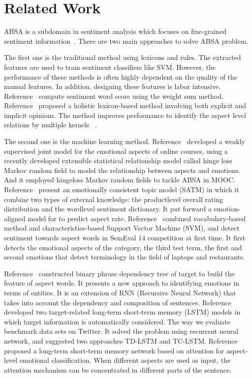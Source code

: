 \documentclass[runningheads, twocolumn]{llncs}
\begin{document}
\section{Related Work}
ABSA is a subdomain in sentiment analysis which focuses on fine-grained sentiment information~\cite{DBLP:series/synthesis/2012Liu}. There are two main approaches to solve ABSA problem.

The first one is the traditional method using lexicons and rules. The extracted features are used to train sentiment classifiers like SVM. However, the performance of these methods is often highly dependent on the quality of the manual features. In addition, designing these features is labor intensive. Reference~\cite{DBLP:conf/kdd/HuL04} compute sentiment word score using the weight sum method. Reference~\cite{DBLP:conf/wsdm/DingLY08} proposed a holistic lexicon-based method involving both explicit and implicit opinions. The method improves performance to identify the aspect level relations by multiple kernels ~\cite{DBLP:conf/cicling/NguyenS15}.

The second one is the machine learning method. Reference~\cite{DBLP:conf/acl/RameshKFG15} developed a weakly supervised joint model for the emotional aspects of online courses, using a recently developed extensible statistical relationship model called hinge loss Markov random field to model the relationship between aspects and emotions. And it employed hingeloss Markov random fields to tackle ABSA in MOOC. Reference~\cite{DBLP:conf/emnlp/WangE14} present an emotionally consistent topic model (SATM) in which it combine two types of external knowledge: the productlevel overall rating distribution and the wordlevel sentiment dictionary. It put forward a emotion-aligned model for to predict aspect rate. Reference~\cite{DBLP:conf/semeval/KiritchenkoZCM14} combined vocabulary-based method and characteristics-based Support Vector Machine (SVM), and  detect sentiment towards aspect words in SemEval 14 competition at first time. It first detects the emotional aspects of the category, the third test term, the first and second emotions that detect terminology in the field of laptops and restaurants. 

Reference~\cite{DBLP:conf/emnlp/NguyenS15} constructed binary phrase dependency tree of target to build the feature of aspect words. It presents a new approach to identifying emotions in terms of entities. It is an extension of RNN (Recursive Neural Network) that takes into account the dependency and composition of sentences. Reference~\cite{DBLP:conf/coling/TangQFL16} developed two target-related long-term short-term memory (LSTM) models in which target information is automatically considered. The way we evaluate benchmark data sets on Twitter. It solved the problem using recurrent neural network, and suggested two approaches TD-LSTM and TC-LSTM. Reference~\cite{DBLP:conf/emnlp/WangHZZ16} proposed a long-term short-term memory network based on attention for aspect-level emotional classification. When different aspects are used as input, the attention mechanism can be concentrated in different parts of the sentence.
\end{document}
